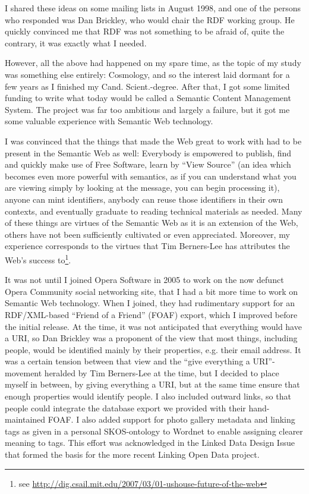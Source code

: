 I shared these ideas on some mailing lists in August 1998, and one of
the persons who responded was Dan Brickley, who would chair the RDF
working group. He quickly convinced me that RDF was not something to
be afraid of, quite the contrary, it was exactly what I needed.

However, all the above had happened on my spare time, as the topic of
my study was something else entirely: Cosmology, and so the interest
laid dormant for a few years as I finished my Cand. Scient.-degree. 
After that, I got some limited funding to write what today would be
called a Semantic Content Management System. The project was far too
ambitious and largely a failure, but it got me some valuable
experience with Semantic Web technology.

I was convinced that the things that made the Web great to work with
had to be present in the Semantic Web as well: Everybody is empowered
to publish, find and quickly make use of Free Software, learn by
``View Source'' (an idea which becomes even more powerful with
semantics, as if you can understand what you are viewing simply by
looking at the message, you can begin processing it), anyone can mint
identifiers, anybody can reuse those identifiers in their own
contexts, and eventually graduate to reading technical materials as
needed. Many of these things are virtues of the Semantic Web as it is
an extension of the Web, others have not been sufficiently cultivated
or even appreciated. Moreover, my experience corresponds to the
virtues that Tim Berners-Lee has attributes the Web's success
to\footnote{see
  \url{http://dig.csail.mit.edu/2007/03/01-ushouse-future-of-the-web}}.

It was not until I joined Opera Software in 2005 to work on the now
defunct Opera Community social networking site, that I had a bit more
time to work on Semantic Web technology. When I joined, they had
rudimentary support for an RDF/XML-based ``Friend of a Friend'' (FOAF)
export, which I improved before the initial release. At the time, it
was not anticipated that everything would have a URI, so Dan Brickley
was a proponent of the view that most things, including people, would
be identified mainly by their properties, e.g. their email address. It
was a certain tension between that view and the ``give everything a
URI''-movement heralded by Tim Berners-Lee at the time, but I decided
to place myself in between, by giving everything a URI, but at the
same time ensure that enough properties would identify people. I also
included outward links, so that people could integrate the database
export we provided with their hand-maintained FOAF. I also added
support for photo gallery metadata and linking tags as given in a
personal SKOS-ontology to Wordnet to enable assigning clearer meaning
to tags. This effort was acknowledged in the Linked Data Design
Issue\cite{linkeddataissue} that formed the basis for the more recent Linking
Open Data project.

